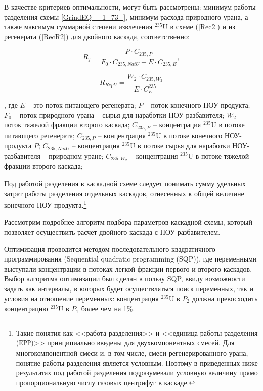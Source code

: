 В качестве критериев оптимальности, могут быть рассмотрены: минимум работы разделения схемы \ref{GrindEQ__1_73_}, минимум расхода природного урана, а также максимум суммарной степени извлечения $^{235}$U в схеме (\ref{Rec2}) и из регенерата (\ref{RecR2}) для двойного каскада, соответственно:


\begin{equation} \label{Rec2} 
    R_f = \frac{P \cdot C_{235,P}}{F_0 \cdot C_{235,NatU} + E \cdot C_{235,E}}, 
\end{equation} 

\begin{equation} \label{RecR2} 
    R_{RepU} = \frac{W_2\cdot C_{235,W_2}}{E \cdot C_{E}^{235}}        
\end{equation} 

, где $E$ -- это поток питающего регенерата; $P$ -- поток конечного НОУ-продукта; $F_0$ -- поток природного урана -- сырья для наработки НОУ-разбавителя; $W_2$ -- поток тяжелой фракции второго каскада;
$C_{235,E}$ -- концентрация $^{235}$U в потоке питающего регенерата; $C_{235,P}$ -- концентрация $^{235}$U в потоке конечного НОУ-продукта $P$; $C_{235,NatU}$ -- концентрация $^{235}$U в потоке сырья для наработки НОУ-разбавителя -- природном уране; $C_{235,W_2}$ -- концентрация $^{235}$U в потоке тяжелой фракции второго каскада;

Под работой разделения в каскадной схеме следует понимать сумму удельных затрат работы разделения отдельных каскадов, отнесенных к общей величине конечного НОУ-продукта.\footnote{Такие понятия как <<работа разделения>> и <<единица работы разделения (ЕРР)>> принципиально введены для двухкомпонентных смесей. Для многокомпонентной смеси и, в том числе, смеси регенерированного урана, понятие работы разделения является условным. Поэтому в приведенных ниже результатах под работой разделения подразумевали условную величину прямо пропорциональную числу газовых центрифуг в каскаде.}



Рассмотрим подробнее алгоритм подбора параметров каскадной схемы, который позволяет осуществить расчет двойного каскада с НОУ-разбавителем.

Оптимизация проводится методом последовательного квадратичного программирования (Sequential quadratic programming (SQP)), где переменными выступали концентрации в потоках легкой фракции первого и второго каскадов. Выбор алгоритма оптимизации был сделан в пользу SQP, ввиду возможности задать как интервалы, в которых будет осуществляться поиск переменных, так и условия на отношение переменных: концентрация $^{235}$U в $P_2$ должна превосходить концентрацию $^{235}$U в $P_1$ более чем на 1\%.


